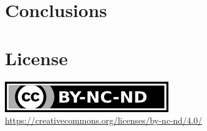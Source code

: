 \documentclass[sigconf, screen]{acmart}
\begin{document}






\section{Conclusions}	%
\label{s:conclusions}




\section*{License}
\label{s:license}
\begin{center}
	\includegraphics{by-nc-nd.png} \\
	\url{https://creativecommons.org/licenses/by-nc-nd/4.0/}
\end{center}
\end{document}
